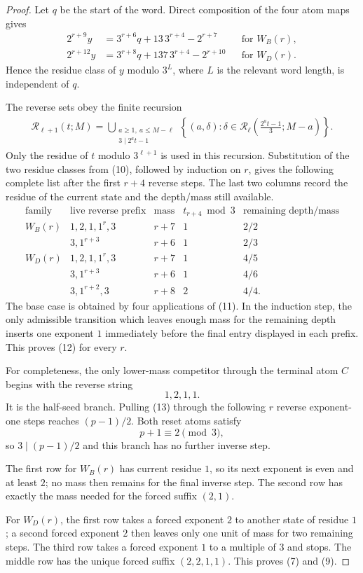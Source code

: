 \documentclass[11pt]{article}
\begin{document}
\begin{proof}
Let $q$ be the start of the word.  Direct composition of the four atom
maps gives
\[
\begin{aligned}
 2^{r+9}y
 &=3^{r+6}q+13\,3^{r+4}-2^{r+7}
 &&\text{for }W_B(r),\\
 2^{r+12}y
 &=3^{r+8}q+137\,3^{r+4}-2^{r+10}
 &&\text{for }W_D(r).
\end{aligned}
\tag{10}
\]
Hence the residue class of $y$ modulo $3^L$, where $L$ is the relevant
word length, is independent of $q$.

The reverse sets obey the finite recursion
\[
\begin{aligned}
 \mathcal R_{\ell+1}(t;M)
 =\bigcup_{\substack{a\geq1,\ a\leq M-\ell\\
                     3\mid 2^at-1}}
 \left\{(a,\delta):
 \delta\in
 \mathcal R_{\ell}\!\left(\frac{2^at-1}{3};M-a\right)
 \right\}.
\end{aligned}
\tag{11}
\]
Only the residue of $t$ modulo $3^{\ell+1}$ is used in this recursion.
Substitution of the two residue classes from (10), followed by induction
on $r$, gives the following complete list after the first $r+4$ reverse
steps.  The last two columns record the residue of the current state and
the depth/mass still available.
\[
\begin{array}{c|c|c|c|c}
\text{family}&\text{live reverse prefix}&\text{mass}
 &t_{r+4}\bmod3&\text{remaining depth/mass}\\ \hline
W_B(r)&1,2,1,1^r,3&r+7&1&2/2\\
      &3,1^{r+3}&r+6&1&2/3\\ \hline
W_D(r)&1,2,1,1^r,3&r+7&1&4/5\\
      &3,1^{r+3}&r+6&1&4/6\\
      &3,1^{r+2},3&r+8&2&4/4.
\end{array}
\tag{12}
\]
The base case is obtained by four applications of (11).  In the induction
step, the only admissible transition which leaves enough mass for the
remaining depth inserts one exponent $1$ immediately before the final
entry displayed in each prefix.  This proves (12) for every $r$.

For completeness, the only lower-mass competitor through the terminal
atom $C$ begins with the reverse string
\[
 1,2,1,1.
 \tag{13}
\]
It is the half-seed branch.  Pulling (13) through the following $r$
reverse exponent-one steps reaches $(p-1)/2$.  Both reset atoms satisfy
\[
 p+1\equiv2\pmod3,
 \tag{14}
\]
so $3\mid(p-1)/2$ and this branch has no further inverse step.

The first row for $W_B(r)$ has current residue $1$, so its next exponent
is even and at least $2$; no mass then remains for the final inverse step.
The second row has exactly the mass needed for the forced suffix $(2,1)$.

For $W_D(r)$, the first row takes a forced exponent $2$ to another state
of residue $1$; a second forced exponent $2$ then leaves only one unit of
mass for two remaining steps.  The third row takes a forced exponent $1$
to a multiple of $3$ and stops.  The middle row has the unique forced
suffix $(2,2,1,1)$.  This proves (7) and (9).
\end{proof}
\end{document}
